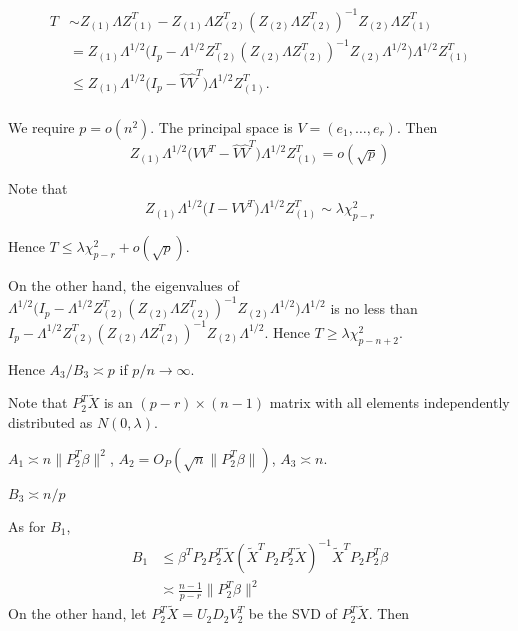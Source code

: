 \documentclass[review]{elsarticle}
\theoremstyle{plain}
\theoremstyle{definition}
\theoremstyle{remark}
\begin{document}
\begin{equation}
    \begin{aligned}
        T&\sim Z_{(1)}\Lambda Z_{(1)}^T-Z_{(1)}\Lambda Z_{(2)}^T{(Z_{(2)}\Lambda Z_{(2)}^T)}^{-1}Z_{(2)}\Lambda Z_{(1)}^T\\
        &=Z_{(1)}\Lambda^{1/2}\big(I_p -\Lambda^{1/2} Z_{(2)}^T{(Z_{(2)}\Lambda Z_{(2)}^T)}^{-1}Z_{(2)}\Lambda^{1/2} \big)\Lambda^{1/2}Z_{(1)}^T\\
        &\leq Z_{(1)}\Lambda^{1/2}\big(I_p -\hat{V}\hat{V}^T\big)\Lambda^{1/2}Z_{(1)}^T.\\
    \end{aligned}
\end{equation}

We require $p=o(n^2)$. The principal space is $V=(e_1,\ldots, e_r)$. Then 
\begin{equation}
    Z_{(1)}\Lambda^{1/2}\big(VV^T -\hat{V}\hat{V}^T\big)\Lambda^{1/2}Z_{(1)}^T=o(\sqrt{p})
\end{equation}

Note that
\begin{equation}
    Z_{(1)}\Lambda^{1/2}\big (I-VV^T) \Lambda^{1/2}Z_{(1)}^T\sim\lambda \chi^2_{p-r}
\end{equation}

Hence $T\leq \lambda\chi^2_{p-r}+o(\sqrt{p})$.

On the other hand, the eigenvalues of $\Lambda^{1/2}\big(I_p -\Lambda^{1/2} Z_{(2)}^T{(Z_{(2)}\Lambda Z_{(2)}^T)}^{-1}Z_{(2)}\Lambda^{1/2} \big)\Lambda^{1/2}$ is no less than $I_p -\Lambda^{1/2} Z_{(2)}^T{(Z_{(2)}\Lambda Z_{(2)}^T)}^{-1}Z_{(2)}\Lambda^{1/2}$. Hence $T\geq \lambda \chi^2_{p-n+2}$.

Hence $A_3/B_3\asymp p$ if $p/n\to \infty$.


Note that $P_2^T \tilde{X}$ is an $(p-r)\times (n-1)$ matrix with all elements independently distributed as $N(0,\lambda)$.

    $A_1\asymp n\|P_2^T\beta\|^2$, $A_2=O_P(\sqrt{n}\|P_2^T \beta\|)$, $A_3\asymp n$.

    $B_3\asymp n/p$

    As for $B_1$, 
\begin{equation}
    \begin{aligned}
        B_1&\leq \beta^T P_2 P_2^T \tilde{X} {(\tilde{X}^T P_2 P_2^T \tilde{X})}^{-1}\tilde{X}^T P_2 P_2^T \beta\\
        &\asymp \frac{n-1}{p-r}\|P_2^T\beta\|^2
    \end{aligned}
\end{equation}
On the other hand, let $P_2^T \tilde{X}=U_2 D_2 V_2^T$ be the SVD of $P_2^T \tilde{X}$. Then
\end{document}
